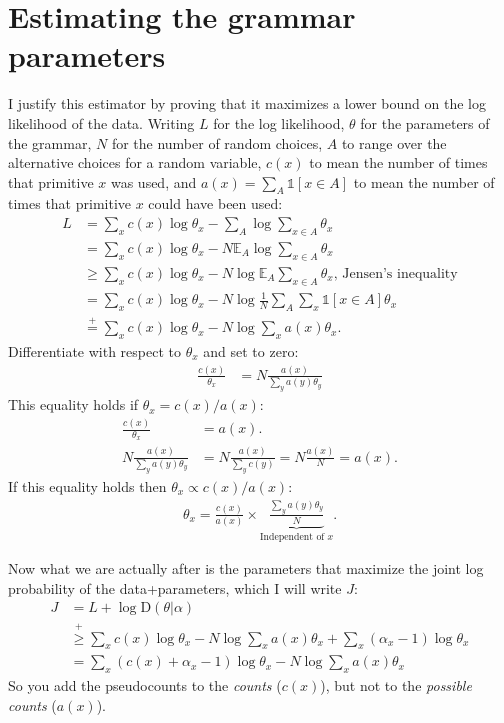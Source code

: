 \documentclass{article}
\newcommand{\indicator}{\mathds{1}} %
\newcommand{\expect}{\mathds{E}} %
\begin{document}
\section{Estimating the grammar parameters}

I justify this estimator by proving that it maximizes a lower bound on the log likelihood of the data. Writing $L$ for the log likelihood, $\theta$ for the parameters of the grammar, $N$ for the number of random choices, $A$ to range over the alternative choices for a random variable, $c(x)$ to mean the number of times that primitive $x$ was used, and $a(x) = \sum_A \indicator [x\in A]$ to mean the number of times that primitive $x$ could have been used:
\begin{align}
  L& = \sum_x c(x)\log \theta_x - \sum_A \log \sum_{x\in A}\theta_x\\
  & = \sum_x c(x)\log \theta_x - N\expect_A \log \sum_{x\in A}\theta_x\\
  &\geq\sum_x c(x)\log \theta_x - N \log \expect_A \sum_{x\in A}\theta_x\text{, Jensen's inequality}\\
  & = \sum_x c(x)\log \theta_x - N \log \frac{1}{N}\sum_A \sum_{x} \indicator [x\in A]\theta_x\\
  & \stackrel{+}{=} \sum_x c(x)\log \theta_x - N \log \sum_x a(x)\theta_x.
\end{align}
Differentiate with respect to $\theta_x$ and set to zero:
\begin{align}
  \frac{c(x)}{\theta_x} &= N\frac{a(x)}{\sum_y a(y)\theta_y}
\end{align}
This equality holds if $\theta_x = c(x)/a(x)$:
\begin{align}
  \frac{c(x)}{\theta_x} &= a(x).\\
N\frac{a(x)}{\sum_y a(y)\theta_y}& = N\frac{a(x)}{\sum_y c(y)}   = N\frac{a(x)}{N} = a(x).
\end{align}
If this equality holds then $\theta_x \propto c(x)/a(x)$:
\begin{align}
  \theta_x = \frac{c(x)}{a(x)}\times \underbrace{\frac{\sum_y a(y)\theta_y}{N}}_{\text{Independent of $x$}}.
\end{align}

Now what we are actually after is the parameters that maximize the joint log probability of the data+parameters, which I will write $J$:
\begin{align}
  J& = L + \log \text{D}(\theta|\alpha)\\
  &\stackrel{+}{\geq } \sum_x c(x)\log \theta_x - N \log \sum_x a(x)\theta_x  + \sum_x(\alpha_x - 1)\log \theta_x\\
  & = \sum_x (c(x) + \alpha_x - 1)\log \theta_x -  N \log \sum_x a(x)\theta_x
\end{align}
So you add the pseudocounts to the \emph{counts} ($c(x)$), but not to the \emph{possible counts} ($a(x)$).




\end{document}
